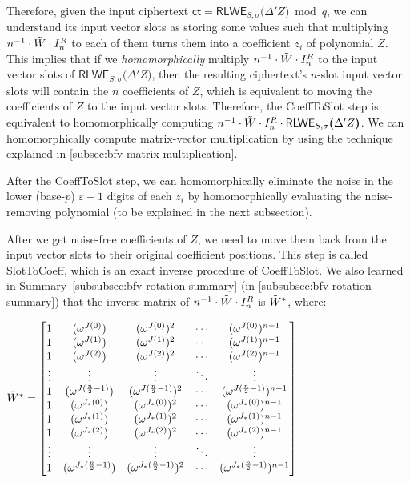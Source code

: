 Therefore, given the input ciphertext $\textsf{ct} = \textsf{RLWE}_{S, \sigma}\bm(\Delta' Z\bm) \bmod q$, we can understand its input vector slots as storing some values such that multiplying $n^{-1}\cdot\tilde{W} \cdot I_n^R$ to each of them turns them into a coefficient $z_i$ of polynomial $Z$. This implies that if we \textit{homomorphically} multiply $n^{-1}\cdot\tilde{W} \cdot I_n^R$ to the input vector slots of $\textsf{RLWE}_{S, \sigma}\bm(\Delta' Z\bm)$, then the resulting ciphertext's $n$-slot input vector slots will contain the $n$ coefficients of $Z$, which is equivalent to moving the coefficients of $Z$ to the input vector slots. Therefore, the \textsf{CoeffToSlot} step is equivalent to homomorphically computing $n^{-1}\cdot\tilde{W} \cdot I_n^R \cdot \textsf{RLWE}_{S, \sigma}\bm(\Delta' Z\bm)$. We can homomorphically compute matrix-vector multiplication by using the technique explained in \autoref{subsec:bfv-matrix-multiplication}.

After the \textsf{CoeffToSlot} step, we can homomorphically eliminate the noise in the lower (base-$p$) $\varepsilon-1$ digits of each $z_i$ by homomorphically evaluating the noise-removing polynomial (to be explained in the next subsection).  

After we get noise-free coefficients of $Z$, we need to move them back from the input vector slots to their original coefficient positions. This step is called \textsf{SlotToCoeff}, which is an exact inverse procedure of \textsf{CoeffToSlot}. We also learned in Summary~\ref*{subsubsec:bfv-rotation-summary} (in \autoref{subsubsec:bfv-rotation-summary}) that the inverse matrix of $n^{-1}\cdot\tilde{W} \cdot I_n^R$ is $\tilde{W}^*$, where: 

$\tilde{W}^* = \begin{bmatrix}
1 & (\omega^{J(0)}) & (\omega^{J(0)})^2 & \cdots & (\omega^{J(0)})^{n-1}\\
1 & (\omega^{J(1)}) & (\omega^{J(1)})^2 & \cdots & (\omega^{J(1)})^{n-1}\\
1 & (\omega^{J(2)}) & (\omega^{J(2)})^2 & \cdots & (\omega^{J(2)})^{n-1}\\
\vdots & \vdots & \vdots & \ddots & \vdots \\
1 & (\omega^{J(\frac{n}{2}-1)}) & (\omega^{J(\frac{n}{2}-1)})^2 & \cdots & (\omega^{J(\frac{n}{2}-1)})^{n-1}\\
1 & (\omega^{J_*(0)}) & (\omega^{J_*(0)})^2 & \cdots & (\omega^{J_*(0)})^{n-1}\\
1 & (\omega^{J_*(1)}) & (\omega^{J_*(1)})^2 & \cdots & (\omega^{J_*(1)})^{n-1}\\
1 & (\omega^{J_*(2)}) & (\omega^{J_*(2)})^2 & \cdots & (\omega^{J_*(2)})^{n-1}\\
\vdots & \vdots & \vdots & \ddots & \vdots \\
1 & (\omega^{J_*(\frac{n}{2}-1)}) & (\omega^{J_*(\frac{n}{2}-1)})^2 & \cdots & (\omega^{J_*(\frac{n}{2}-1)})^{n-1}\\
\end{bmatrix}$

